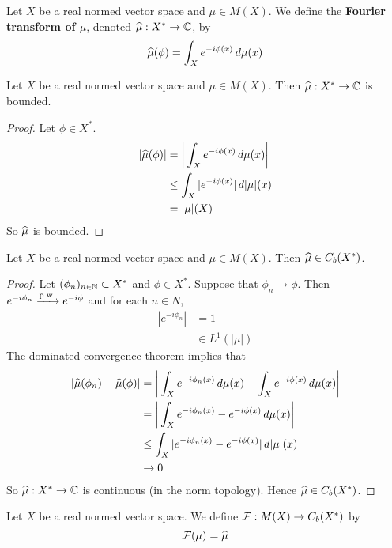 \documentclass{book}
\begin{document}
\begin{defn}
	Let $X$ be a real normed vector space and $\mu \in M(X)$. We define the \textbf{Fourier transform of $\mu$}, denoted $\widehat{\mu}: X^* \rightarrow \mathbb{C}$, by
	$$\widehat{\mu}(\phi) = \int_X e^{-i\phi(x)} \, d \mu(x)$$ 
\end{defn}

\begin{ex}
	Let $X$ be a real normed vector space and $\mu \in M(X)$. Then $\widehat{\mu} : X^* \rightarrow \mathbb{C}$ is bounded.
\end{ex}

\begin{proof}
	Let $\phi \in X^*$. 
	\begin{align*}
		|\widehat{\mu}(\phi)|
		& = \bigg | \int_X e^{-i \phi(x)} \, d \mu(x) \bigg| \\
		& \leq \int_X |e^{-i \phi(x)}| \, d|\mu|(x) \\
		& = |\mu|(X) \\
	\end{align*}
	So $\widehat{\mu}$ is bounded.
\end{proof}

\begin{ex}
	Let $X$ be a real normed vector space and $\mu \in M(X)$. Then $\widehat{\mu} \in C_b(X^*)$.
\end{ex}

\begin{proof}
	Let $(\phi_{n})_{n \in \mathbb{N}} \subset X^*$ and $\phi \in X^*$. Suppose that $\phi_n \rightarrow \phi$. Then $e^{-i \phi_n} \xrightarrow{\text{p.w.}} e^{-i\phi}$ and for each $n \in N$, 
	\begin{align*}
		|e^{-i \phi_n}| 
		& = 1 \\
		& \in L^1(|\mu|)
	\end{align*}
	The dominated convergence theorem implies that
	\begin{align*}
		|\widehat{\mu}(\phi_n) - \widehat{\mu}(\phi)| 
		& = \bigg| \int_X e^{-i \phi_n(x)} \, d \mu(x) - \int_X e^{-i \phi(x)} \, d \mu(x)\bigg| \\
		& =  \bigg| \int_X e^{-i \phi_n(x)} - e^{-i \phi(x)} \, d \mu(x) \bigg| \\
		& \leq \int_X |e^{-i \phi_n(x)} - e^{-i \phi(x)}| \, d|\mu|(x) \\
		& \rightarrow 0
	\end{align*}
	So $\widehat{\mu}: X^* \rightarrow \mathbb{C}$ is continuous (in the norm topology). Hence $\widehat{\mu} \in C_b(X^*)$.
\end{proof}

\begin{defn}
	Let $X$ be a real normed vector space. We define $\mathcal{F}: M(X) \rightarrow C_b(X^*)$ by $$\mathcal{F}(\mu) = \widehat{\mu}$$
\end{defn}
\end{document}
